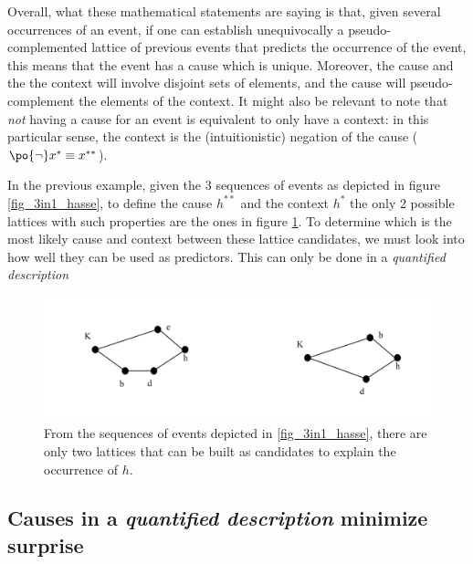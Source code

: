 \documentclass[
		twoside,openright,titlepage,numbers=noenddot,manychapters,
		headinclude,%
                footinclude=false,cleardoublepage=empty,
                BCOR=5mm,
		fontsize=11pt, %
                 enabledeprecatedfontcommands]{scrreprt}
\begin{document}
Overall, what these mathematical statements are saying is that, given several occurrences of an event, if one can establish unequivocally a pseudo-complemented lattice of previous events that predicts the occurrence of the event, this means that the event has a cause which is unique. Moreover, the cause and the the context will involve disjoint sets of elements, and the cause will pseudo-complement the elements of the context. It might also be relevant to note that \emph{not} having a cause for an event is equivalent to only have a context: in this particular sense, the context is the (intuitionistic) negation of the cause ($ \po{ \neg} x^* \equiv x^{**} $).


In the previous example,  given the 3 sequences of events as depicted in figure \ref{fig_3in1_hasse}, to define the cause $h^{**}$ and the context  $h^*$ the only 2 possible lattices with such properties are the ones in figure \ref{fig_2lat}. To determine which is the most likely cause and context between these lattice candidates, we must look into how well they can be used as predictors. This can only be done in a \emph{quantified description}



\begin{figure}[tb]

\begin{center}

\includegraphics[width=12cm]{figures/2lat_hasse.jpg}
\caption{From the sequences of events depicted in \ref{fig_3in1_hasse}, there are only two  lattices that can be built as candidates to explain the occurrence of $h$. }
\label{fig_2lat}

\end{center}

\end{figure}





\subsection{Causes in a \emph{quantified description} minimize surprise}
\end{document}
